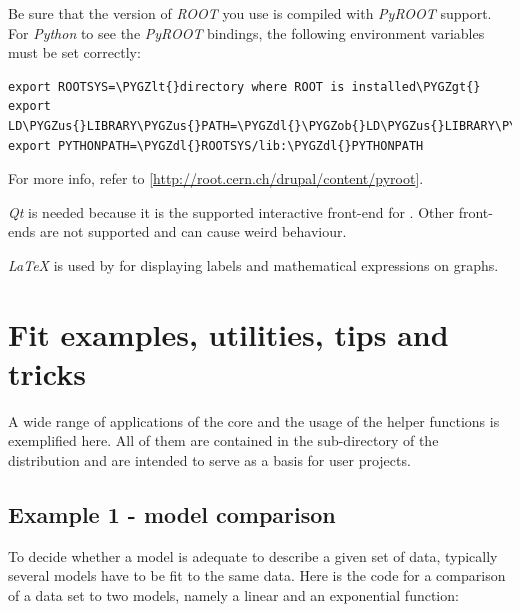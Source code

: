 \documentclass[a4paper,10pt,english]{sphinxmanual}
\def\PYGZus{\char`\_}
\def\PYGZob{\char`\{}
\def\PYGZcb{\char`\}}
\def\PYGZlt{\char`\<}
\def\PYGZgt{\char`\>}
\def\PYGZdl{\char`\$}
\begin{document}
Be sure that the version of \emph{ROOT} you use is compiled with \emph{PyROOT} support.
For \emph{Python} to see the \emph{PyROOT} bindings, the following environment variables
must be set correctly:

\begin{Verbatim}[commandchars=\\\{\}]
export ROOTSYS=\PYGZlt{}directory where ROOT is installed\PYGZgt{}
export LD\PYGZus{}LIBRARY\PYGZus{}PATH=\PYGZdl{}\PYGZob{}LD\PYGZus{}LIBRARY\PYGZus{}PATH\PYGZcb{}:\PYGZdl{}ROOTSYS/lib
export PYTHONPATH=\PYGZdl{}ROOTSYS/lib:\PYGZdl{}PYTHONPATH
\end{Verbatim}

For more info, refer to {[}\href{http://root.cern.ch/drupal/content/pyroot}{http://root.cern.ch/drupal/content/pyroot}{]}.

\emph{Qt} is needed because it is the supported interactive front-end for
. Other front-ends are not supported and can cause weird behaviour.

\emph{LaTeX} is used by  for displaying labels and mathematical
expressions on graphs.


\chapter{Fit examples, utilities, tips and tricks}
\label{index:fit-examples-utilities-tips-and-tricks}
A wide range of applications of the  core and the usage of
the helper functions is exemplified here. All of them
are contained in the sub-directory  of the
 distribution and are intended to serve as a basis for
user projects.


\section{Example 1 - model comparison}
\label{index:example-1-model-comparison}
To decide whether a model is adequate to describe a given
set of data, typically several models have to be fit to the
same data. Here is the code for a comparison of a data set
to two models, namely a linear and an exponential function:
\end{document}
